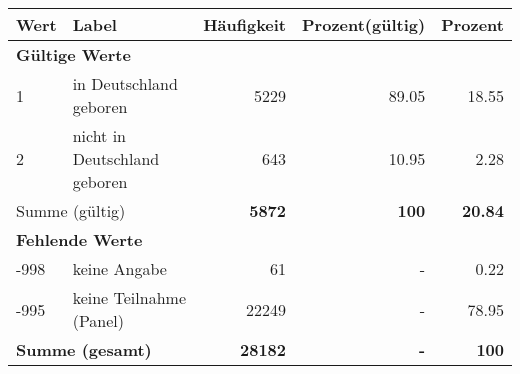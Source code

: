      \begin{longtable}{lXrrr}
     \toprule
     \textbf{Wert} & \textbf{Label} & \textbf{Häufigkeit} & \textbf{Prozent(gültig)} & \textbf{Prozent} \\
     \endhead
     \midrule
     \multicolumn{5}{l}{\textbf{Gültige Werte}}\\

     1 &
     \multicolumn{1}{X}{ in Deutschland geboren   } &


       \num{5229} &
       \num[round-mode=places,round-precision=2]{89,05} &
         \num[round-mode=places,round-precision=2]{18,55} \\

     2 &
     \multicolumn{1}{X}{ nicht in Deutschland geboren   } &


       \num{643} &
       \num[round-mode=places,round-precision=2]{10,95} &
         \num[round-mode=places,round-precision=2]{2,28} \\
     \midrule
     \multicolumn{2}{l}{Summe (gültig)} &
       \textbf{\num{5872}} &
     \textbf{100} &
       \textbf{\num[round-mode=places,round-precision=2]{20,84}} \\
     \multicolumn{5}{l}{\textbf{Fehlende Werte}}\\
       -998 &
       keine Angabe &
         \num{61} &
        - &
         \num[round-mode=places,round-precision=2]{0,22} \\
       -995 &
       keine Teilnahme (Panel) &
         \num{22249} &
        - &
         \num[round-mode=places,round-precision=2]{78,95} \\
     \midrule
     \multicolumn{2}{l}{\textbf{Summe (gesamt)}} &
          \textbf{\num{28182}} &
        \textbf{-} &
        \textbf{100} \\
     \bottomrule
     \end{longtable}
     
